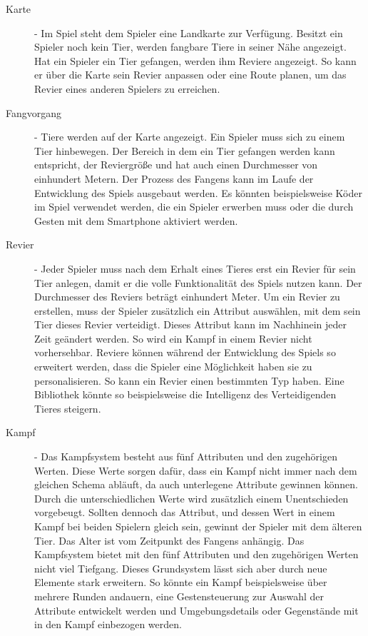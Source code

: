 \begin{description}

\item[Karte] - 
Im Spiel steht dem Spieler eine Landkarte zur Verfügung. Besitzt ein Spieler noch kein Tier, werden fangbare Tiere in seiner Nähe angezeigt. Hat ein Spieler ein Tier gefangen, werden ihm Reviere angezeigt. So kann er über die Karte sein Revier anpassen oder eine Route planen, um das Revier eines anderen Spielers zu erreichen. 

\item[Fangvorgang] - 
Tiere werden auf der Karte angezeigt. Ein Spieler muss sich zu einem Tier hinbewegen. Der Bereich in dem ein Tier gefangen werden kann entspricht, der Reviergröße und hat auch einen Durchmesser von einhundert Metern. Der Prozess des Fangens kann im Laufe der Entwicklung des Spiels ausgebaut werden. Es könnten beispielsweise Köder im Spiel verwendet werden, die ein Spieler erwerben muss oder die durch Gesten mit dem Smartphone aktiviert werden. 

\item[Revier] - 
Jeder Spieler muss nach dem Erhalt eines Tieres erst ein Revier für sein Tier anlegen, damit er die volle Funktionalität des Spiels nutzen kann. Der Durchmesser des Reviers beträgt einhundert Meter. Um ein Revier zu erstellen, muss der Spieler zusätzlich ein Attribut auswählen, mit dem sein Tier dieses Revier verteidigt. Dieses Attribut kann im Nachhinein jeder Zeit geändert werden. So wird ein Kampf in einem Revier nicht vorhersehbar. Reviere können während der Entwicklung des Spiels so erweitert werden, dass die Spieler eine Möglichkeit haben sie zu personalisieren. So kann ein Revier einen bestimmten Typ haben. Eine Bibliothek könnte so beispielsweise die Intelligenz des Verteidigenden Tieres steigern.

\item[Kampf] - 
Das Kampfsystem besteht aus fünf Attributen und den zugehörigen Werten. Diese Werte sorgen dafür, dass ein Kampf nicht immer nach dem gleichen Schema abläuft, da auch unterlegene Attribute gewinnen können. Durch die unterschiedlichen Werte wird zusätzlich einem Unentschieden vorgebeugt. Sollten dennoch das Attribut, und dessen Wert in einem Kampf bei beiden Spielern gleich sein, gewinnt der Spieler mit dem älteren Tier. Das Alter ist vom Zeitpunkt des Fangens anhängig. Das Kampfsystem bietet mit den fünf Attributen und den zugehörigen Werten nicht viel Tiefgang. Dieses Grundsystem lässt sich aber durch neue Elemente stark erweitern. So könnte ein Kampf beispielsweise über mehrere Runden andauern, eine Gestensteuerung zur Auswahl der Attribute entwickelt werden und Umgebungsdetails oder Gegenstände mit in den Kampf einbezogen werden.


\end{description}
